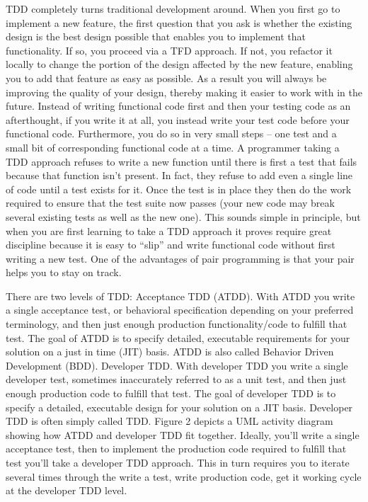 TDD completely turns traditional development around. When you first go to implement a new feature, the first question that you ask is whether the existing design is the best design possible that enables you to implement that functionality. If so, you proceed via a TFD approach.  If not, you refactor it locally to change the portion of the design affected by the new feature, enabling you to add that feature as easy as possible. As a result you will always be improving the quality of your design, thereby making it easier to work with in the future.
Instead of writing functional code first and then your testing code as an afterthought, if you write it at all, you instead write your test code before your functional code.  Furthermore, you do so in very small steps – one test and a small bit of corresponding functional code at a time.  A programmer taking a TDD approach refuses to write a new function until there is first a test that fails because that function isn’t present. In fact, they refuse to add even a single line of code until a test exists for it.  Once the test is in place they then do the work required to ensure that the test suite now passes (your new code may break several existing tests as well as the new one).  This sounds simple in principle, but when you are first learning to take a TDD approach it proves require great discipline because it is easy to “slip” and write functional code without first writing a new test.  One of the advantages of pair programming is that your pair helps you to stay on track.

There are two levels of TDD:
Acceptance TDD (ATDD).  With ATDD you write a single acceptance test, or behavioral specification depending on your preferred terminology, and then just enough production functionality/code to fulfill that test. The goal of ATDD is to specify detailed, executable requirements for your solution on a just in time (JIT) basis. ATDD is also called Behavior Driven Development (BDD).
Developer TDD. With developer TDD you write a single developer test, sometimes inaccurately referred to as a unit test, and then just enough production code to fulfill that test. The goal of developer TDD is to specify a detailed, executable design for your solution on a JIT basis. Developer TDD is often simply called TDD.
Figure 2 depicts a UML activity diagram showing how ATDD and developer TDD fit together.  Ideally, you'll write a single acceptance test, then to implement the production code required to fulfill that test you'll take a developer TDD approach. This in turn requires you to iterate several times through the write a test, write production code, get it working cycle at the developer TDD level.
